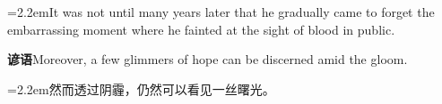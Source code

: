 \documentclass[11pt,a4paper]{article}
\newcommand{\num}[1]{\makebox[1.9em][r]{#1.}\hspace{0.3em}}
\begin{document}
\vspace{0.15em}

\noindent\hangindent=2.2em\hspace{2.2em}It was not until many years later that he gradually came to forget the embarrassing moment where he fainted at the sight of blood in public.

\vspace{0.4em}\noindent{\color{rulegray}\rule{\textwidth}{0.6pt}}\vspace{0.4em}

\num{5}\textbf{谚语}\quad Moreover, a few glimmers of hope can be discerned amid the gloom.

\vspace{0.15em}

\noindent\hangindent=2.2em\hspace{2.2em}然而透过阴霾，仍然可以看见一丝曙光。
\end{document}
